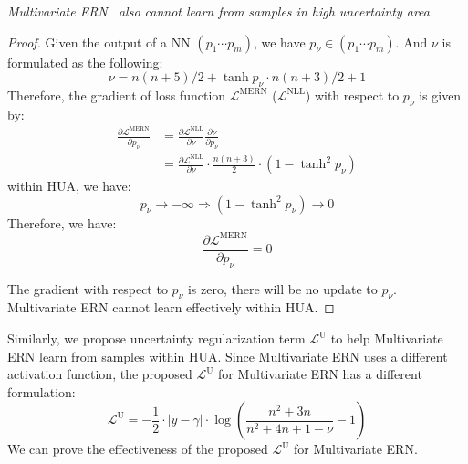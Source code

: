 \begin{theorem}
\textit{Multivariate ERN~\cite{meinert2021multivariate} also cannot learn from samples in high uncertainty area.}
\end{theorem}

\begin{proof}
Given the output of a NN $\left(p_1 \cdots p_m\right)$, we have $p_\nu \in\left(p_1 \cdots p_m\right)$. And $\nu$ is formulated as the following:
\begin{equation}
    \nu = n(n+5)/2+\tanh p_{\nu} \cdot  n(n+3)/2  + 1
\end{equation}
Therefore, the gradient of loss function $\mathcal{L}^{\mathrm{MERN}}$ ($\mathcal{L}^{\mathrm{NLL}}$) with respect to $p_{\nu}$ is given by:
\begin{equation}
\begin{aligned}
\frac{\partial \mathcal{L}^{\mathrm{MERN}}}{\partial p_{\nu}}&=\frac{\partial \mathcal{L}^{\mathrm{NLL}}}{\partial \nu} \frac{\partial \nu}{\partial p_{\nu}} \\
&=\frac{\partial \mathcal{L}^{\mathrm{NLL}}}{\partial \nu} \cdot \frac{n(n+3)}{2} \cdot (1-\tanh^2 p_{\nu})
\end{aligned}
\end{equation}
within HUA, we have:
\begin{equation}
        p_{\nu} \rightarrow -\infty \Rightarrow (1-\tanh^2 p_{\nu}) \rightarrow 0 
\end{equation}
Therefore, we have:
\begin{equation}
    \frac{\partial \mathcal{L}^{\mathrm{MERN}}}{\partial p_{\nu}} = 0
\end{equation}

The gradient with respect to $p_{\nu}$ is zero, there will be no update to $p_{\nu}$. Multivariate ERN cannot learn effectively within HUA.
\end{proof}

Similarly, we propose uncertainty regularization term $\mathcal{L}^{\mathrm{U}}$ to help Multivariate ERN learn from samples within HUA. Since Multivariate ERN uses a different activation function, the proposed $\mathcal{L}^{\mathrm{U}}$ for Multivariate ERN has a different formulation:
\begin{equation}
    \mathcal{L}^{\mathrm{U}} = -\frac{1}{2} \cdot|y-\gamma| \cdot \log(\frac{n^2 + 3n}{n^2 + 4n+1-\nu}-1)
\end{equation}
We can prove the effectiveness of the proposed $\mathcal{L}^{\mathrm{U}}$ for Multivariate ERN. 


